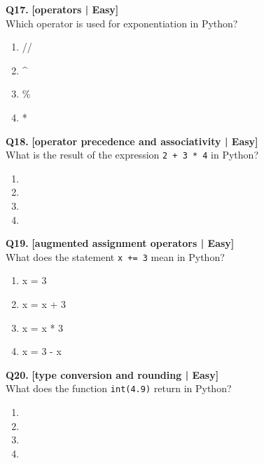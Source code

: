 \noindent\textbf{Q17.} \hfill {\small\color{LPUOrange}\textbf{[operators | Easy]}}\\[2pt]
Which operator is used for exponentiation in Python?

\begin{enumerate}[label=(\alph*),topsep=2pt,itemsep=1pt,partopsep=0pt,parsep=0pt]
    \item \relax //
    \item \relax \textasciicircum{}
    \item \relax \%
    \item \relax **
\end{enumerate}
\vspace{2mm}

\noindent\textbf{Q18.} \hfill {\small\color{LPUOrange}\textbf{[operator precedence and associativity | Easy]}}\\[2pt]
What is the result of the expression \texttt{2 + 3 * 4} in Python?

\begin{enumerate}[label=(\alph*),topsep=2pt,itemsep=1pt,partopsep=0pt,parsep=0pt]
    \item {}
    \item {}
    \item {}
    \item {}
\end{enumerate}
\vspace{2mm}

\noindent\textbf{Q19.} \hfill {\small\color{LPUOrange}\textbf{[augmented assignment operators | Easy]}}\\[2pt]
What does the statement \texttt{x += 3} mean in Python?

\begin{enumerate}[label=(\alph*),topsep=2pt,itemsep=1pt,partopsep=0pt,parsep=0pt]
    \item \relax x = 3
    \item \relax x = x + 3
    \item \relax x = x * 3
    \item \relax x = 3 - x
\end{enumerate}
\vspace{2mm}

\noindent\textbf{Q20.} \hfill {\small\color{LPUOrange}\textbf{[type conversion and rounding | Easy]}}\\[2pt]
What does the function \texttt{int(4.9)} return in Python?

\begin{enumerate}[label=(\alph*),topsep=2pt,itemsep=1pt,partopsep=0pt,parsep=0pt]
    \item {}
    \item {}
    \item {}
    \item {}
\end{enumerate}
\vspace{2mm}

